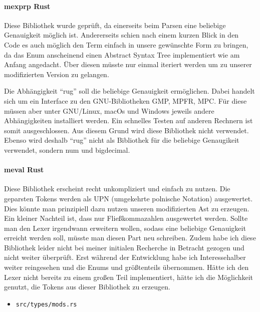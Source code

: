 \documentclass[11pt,a4paper, ngerman]{article}
\begin{document}
\paragraph{mexprp Rust} \cite{CrateMexprp} Diese Bibliothek wurde geprüft, da einerseits beim Parsen eine beliebige Genauigkeit möglich ist. Andererseits schien nach einem kurzen Blick in den Code es auch möglich den Term einfach in unsere gewünschte Form zu bringen, da das Enum  anscheinend einen Abstract Syntax Tree implementiert wie am Anfang angedacht. Über diesen müsste nur einmal iteriert werden um zu unserer modifizierten Version zu gelangen.

Die Abhängigkeit ``rug'' soll die beliebige Genauigkeit ermöglichen. Dabei handelt sich um ein Interface zu den GNU-Bibliotheken GMP, MPFR, MPC. Für diese müssen aber unter GNU/Linux, macOs und Windows jeweils andere Abhängigkeiten installiert werden. Ein schnelles Testen auf anderen Rechnern ist somit ausgeschlossen. Aus diesem Grund wird diese Bibliothek nicht verwendet. Ebenso wird deshalb ``rug'' nicht als Bibliothek für die beliebige Genaugikeit verwendet, sondern num und bigdecimal.

\paragraph{meval Rust} \cite{CrateMeval} Diese Bibliothek erscheint recht unkompliziert und einfach zu nutzen. Die geparsten Tokens werden als UPN (umgekehrte polnische Notation) ausgewertet. Dies könnte man prinzipiell dazu nutzen unseren modifizierten Ast zu erzeugen. Ein kleiner Nachteil ist, dass nur Fließkommazahlen ausgewertet werden. Sollte man den Lexer irgendwann erweitern wollen, sodass eine beliebige Genauigkeit erreicht werden soll, müsste man diesen Part neu schreiben. Zudem habe ich diese Bibliothek leider nicht bei meiner initialen Recherche in Betracht gezogen und nicht weiter überprüft. Erst während der Entwicklung habe ich Interessehalber weiter reingesehen und die Enums  und  größtenteils übernommen. Hätte ich den Lexer nicht bereits zu einem großen Teil implementiert, hätte ich die Möglichkeit genutzt, die Tokens aus dieser Bibliothek zu erzeugen.

\begin{itemize}
    \item \begin{verbatim}src/types/mods.rs\end{verbatim}
\end{itemize}
\end{document}
